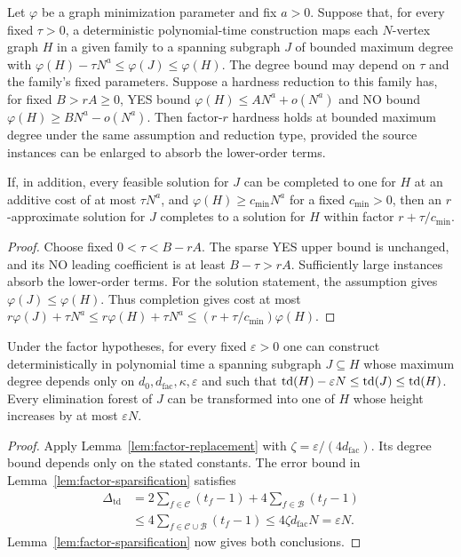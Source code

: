 \begin{lemma}
\label{lem:factor-gap-transfer}
Let $\varphi$ be a graph minimization parameter and fix $a>0$.
Suppose that, for every fixed $\tau>0$, a deterministic
polynomial-time construction maps each $N$-vertex graph $H$ in
a given family to a spanning subgraph $J$ of bounded maximum degree
with $\varphi(H)-\tau N^a\le\varphi(J)\le\varphi(H)$.
The degree bound may depend on $\tau$ and the family's fixed
parameters. Suppose a hardness reduction to this family has, for
fixed $B>rA\ge0$, YES bound $\varphi(H)\le AN^a+o(N^a)$ and
NO bound $\varphi(H)\ge BN^a-o(N^a)$.
Then factor-$r$ hardness holds at bounded maximum degree under the
same assumption and reduction type, provided the source instances
can be enlarged to absorb the lower-order terms.

If, in addition, every feasible solution for $J$ can be completed
to one for $H$ at an additive cost of at most $\tau N^a$, and
$\varphi(H)\ge c_{\min}N^a$ for a fixed $c_{\min}>0$, then an $r$-approximate
solution for $J$ completes to a solution for $H$ within factor
$r+\tau/c_{\min}$.
\end{lemma}

\begin{proof}
Choose fixed $0<\tau<B-rA$. The sparse YES upper bound is
unchanged, and its NO leading coefficient is at least
$B-\tau>rA$. Sufficiently large instances absorb the lower-order
terms. For the solution statement, the assumption gives
$\varphi(J)\le\varphi(H)$. Thus completion gives cost at most
$r\varphi(J)+\tau N^a\le r\varphi(H)+\tau N^a\le(r+\tau/c_{\min})\varphi(H)$.
\end{proof}

\begin{theorem}
\label{thm:td-sparsification}
Under the factor hypotheses, for every fixed $\varepsilon>0$
one can construct deterministically in polynomial time a spanning
subgraph $J\subseteq H$ whose maximum degree depends only on
$d_0,d_{\mathrm{fac}},\kappa,\varepsilon$ and such that
$\operatorname{td}(H)-\varepsilon N\le\operatorname{td}(J)\le\operatorname{td}(H)$.
Every elimination forest of $J$ can be transformed into one of
$H$ whose height increases by at most $\varepsilon N$.
\end{theorem}

\begin{proof}
Apply Lemma~\ref{lem:factor-replacement} with
$\zeta=\varepsilon/(4d_{\mathrm{fac}})$. Its degree bound depends only on
the stated constants. The error bound in
Lemma~\ref{lem:factor-sparsification} satisfies
\begin{equation}\label{eq:common-forest-exception-budget}
 \begin{aligned}
 \Delta_{\mathrm{td}}
 &=2\sum_{f\in\mathcal C}(t_f-1)+4\sum_{f\in\mathcal B}(t_f-1)\\
 &\le4\sum_{f\in\mathcal C\cup\mathcal B}(t_f-1)
 \le4\zeta d_{\mathrm{fac}}N=\varepsilon N.
 \end{aligned}
\end{equation}
Lemma~\ref{lem:factor-sparsification} now gives both conclusions.
\end{proof}


